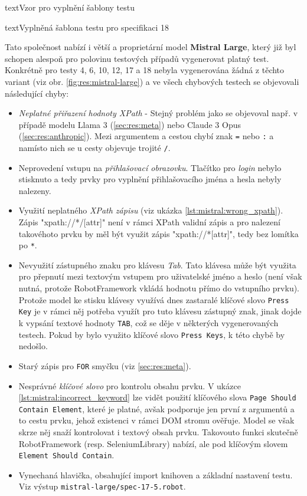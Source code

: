 \documentclass[czech, ma, kiv, he, iso690numb, pdf, viewonly]{fasthesis}
\begin{document}
\begin{code}{text}{Vzor pro vyplnění šablony testu \label{lst:template}}
{\begin{code}{text}{Vyplněná šablona testu pro specifikaci 18 \label{lst:spec18}}
{        \noindent Tato společnost nabízí i větší a proprietární model \textbf{Mistral Large}, který již byl schopen alespoň pro polovinu testových případů vygenerovat platný test. Konkrétně pro testy 4, 6, 10, 12, 17 a 18 nebyla vygenerována žádná z těchto variant (viz obr. \ref{fig:res:mistral-large}) a ve všech chybových testech se objevovali následující chyby:
        \begin{itemize}
            \item \emph{Neplatné přiřazení hodnoty XPath} - Stejný problém jako se objevoval např. v případě modelu Llama 3 (\ref{sec:res:meta}) nebo Claude 3 Opus (\ref{sec:res:anthropic}). Mezi argumentem a cestou chybí znak \verb|=| nebo \verb|:| a namísto nich se u cesty objevuje trojité \verb|/|.
            \item Neprovedení vstupu na \emph{přihlašovací obrazovku}. Tlačítko pro \emph{login} nebylo stisknuto a tedy prvky pro vyplnění přihlašovacího jména a hesla nebyly nalezeny.
            \item Využití neplatného \emph{XPath zápisu} (viz ukázka \ref{lst:mistral:wrong_xpath}). Zápis "xpath://*/[attr]" není v rámci XPath validní zápis a pro nalezení takovéhoto prvku by měl být využit zápis "xpath://*[attr]", tedy bez lomítka po \verb|*|.
            \item Nevyužití zástupného znaku pro klávesu \textit{Tab}. Tato klávesa může být využita pro přepnutí mezi textovým vstupem pro uživatelské jméno a heslo (není však nutná, protože RobotFramework vkládá hodnotu přímo do vstupního prvku). Protože model ke stisku klávesy využívá dnes zastaralé klíčové slovo \verb|Press Key| je v rámci něj potřeba využít pro tuto klávesu zástupný znak, jinak dojde k vypsání textové hodnoty \verb|TAB|, což se děje v některých vygenerovaných testech. Pokud by bylo využito klíčové slovo \verb|Press Keys|, k této chybě by nedošlo.
            \item Starý zápis pro \verb|FOR| smyčku (viz \ref{sec:res:meta}).
            \item Nesprávné \emph{klíčové slovo} pro kontrolu obsahu prvku. V ukázce \ref{lst:mistral:incorrect_keyword} lze vidět použití klíčového slova \verb|Page Should Contain Element|, které je platné, avšak podporuje jen první z argumentů a to cestu prvku, jehož existenci v rámci DOM stromu ověřuje. Model se však skrze něj snaží kontrolovat i textový obsah prvku. Takovouto funkci skutečně RobotFramework (resp. SeleniumLibrary) nabízí, ale pod klíčovým slovem \verb|Element Should Contain|.
            \item Vynechaná hlavička, obsahující import knihoven a základní nastavení testu. Viz výstup \verb|mistral-large/spec-17-5.robot|.
        \end{itemize}

}
\end{code}}
\end{code}
\end{document}
